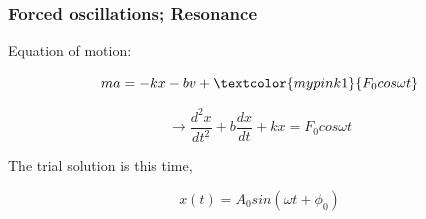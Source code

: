 \documentclass[]{beamer}
\begin{document}

\begin{frame}
\frametitle{ Forced oscillations; Resonance}


Equation of motion:

\vspace{3mm}
 \begin{equation}
ma=-kx-bv+\textcolor{mypink1}{F_0cos\omega t}
\end{equation}
\vspace{3mm}
\pause


 \begin{equation}
\rightarrow \frac{d^2x}{dt^2}+b\frac{dx}{dt}+kx=F_0cos\omega t
\end{equation}
\pause


\vspace{3mm}
The trial solution is this time,
\pause


 \begin{equation}
x(t)=A_0sin(\omega t +\phi_0)
\end{equation}


\end{frame}




\end{document}
